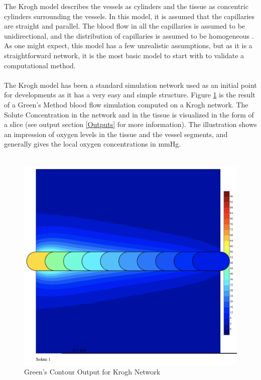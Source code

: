 The Krogh model describes the vessels as cylinders and the tissue as concentric cylinders surrounding the vessels. In this model, it is assumed that the capillaries are straight and parallel. The blood flow in all the capillaries is assumed to be unidirectional, and the distribution of capillaries is assumed to be homogeneous \cite{kreuzer1982oxygen}. As one might expect, this model has a few unrealistic assumptions, but as it is a straightforward network, it is the most basic model to start with to validate a computational method.\\
\\The Krogh model has been a standard simulation network used as an initial point for developments as it has a very easy and simple structure.
Figure \ref{fig:Contour_Krogh} is the result of a Green's Method blood flow simulation computed on a Krogh network. The Solute Concentration in the network and in the tissue is visualized in the form of a slice (see output section \ref{Outputs} for more information). The illustration shows an impression of oxygen levels in the tissue and the vessel segments, and generally gives the local oxygen concentrations in mmHg.\\\\
\begin{figure}[h]
\centering
\includegraphics[width=120mm]{Contour_Krogh}
\caption{\footnotesize Green's Contour Output for Krogh Network}
\label{fig:Contour_Krogh}
\end{figure}
